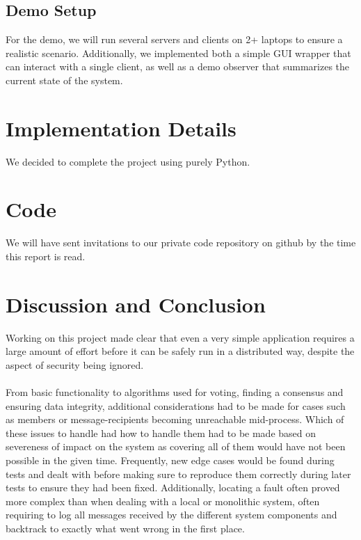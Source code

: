 \documentclass[runningheads]{llncs}
\begin{document}
\subsection{Demo Setup}
For the demo, we will run several servers and clients on 2+ laptops to ensure a realistic scenario.
Additionally, we implemented both a simple GUI wrapper that can interact with a single client, as well as a demo observer that summarizes the current state of the system.
\section{Implementation Details}
We decided to complete the project using purely Python.











\newpage
\section{Code}
We will have sent invitations to our private code repository on github by the time this report is read.

\section{Discussion and Conclusion}
Working on this project made clear that even a very simple application requires a large amount of effort before it can be safely run in a distributed way, despite the aspect of security being ignored.
\\\\
From basic functionality to algorithms used for voting, finding a consensus and ensuring data integrity, additional considerations had to be made for cases such as members or message-recipients becoming unreachable mid-process. Which of these issues to handle had how to handle them had to be made based on severeness of impact on the system as covering all of them would have not been possible in the given time.
Frequently, new edge cases would be found during tests and dealt with  before making sure to reproduce them correctly during later tests to ensure they had been fixed.
Additionally, locating a fault often proved more complex than when dealing with a local or monolithic system, often requiring to log all messages received by the different system components and backtrack to exactly what went wrong in the first place.
\end{document}

